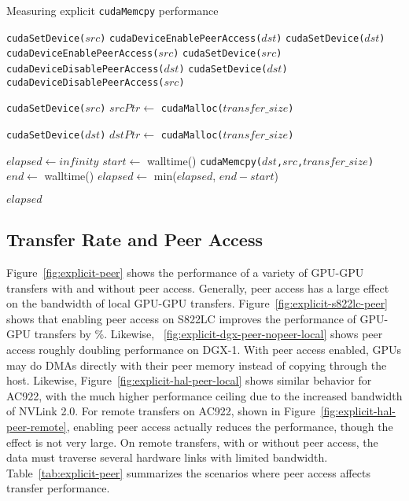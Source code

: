 \begin{algorithm}
    \caption{Measuring explicit \texttt{cudaMemcpy} performance}
    \label{alg:explicit}
    \begin{algorithmic}[1]
    \Statex
            \State \texttt{cudaSetDevice($src$)}
            \State \texttt{cudaDeviceEnablePeerAccess($dst$)}
            \State \texttt{cudaSetDevice($dst$)}
            \State \texttt{cudaDeviceEnablePeerAccess($src$)}
        \Else
            \State \texttt{cudaSetDevice($src$)}
            \State \texttt{cudaDeviceDisablePeerAccess($dst$)}
            \State \texttt{cudaSetDevice($dst$)}
            \State \texttt{cudaDeviceDisablePeerAccess($src$)}        
        \EndIf

        \State \texttt{cudaSetDevice($src$)} 
        \State $srcPtr \gets$ \texttt{cudaMalloc($transfer\_size$)}

        \State \texttt{cudaSetDevice($dst$)} 
        \State $dstPtr \gets$ \texttt{cudaMalloc($transfer\_size$)}

        \State $elapsed \gets infinity$ 
            \State $start \gets$ walltime()
            \State \texttt{cudaMemcpy($dst$,$src$,$transfer\_size$)}
            \State $end \gets$ walltime()
            \State $elapsed \gets$ min($elapsed$, $end-start$)
        \EndFor

    \Return $elapsed$
    \EndFunction

    \end{algorithmic}
\end{algorithm}

\subsection{Transfer Rate and Peer Access}
\label{sec:explicit-peer-bandwidth}

Figure~\ref{fig:explicit-peer} shows the performance of a variety of GPU-GPU transfers with and without peer access.
Generally, peer access has a large effect on the bandwidth of local GPU-GPU transfers.
Figure~\ref{fig:explicit-s822lc-peer} shows that enabling peer access on S822LC improves the performance of GPU-GPU transfers by \%.
Likewise, ~\ref{fig:explicit-dgx-peer-nopeer-local} shows peer access roughly doubling performance on DGX-1.
With peer access enabled, GPUs may do DMAs directly with their peer memory instead of copying through the host.
Likewise, Figure~\ref{fig:explicit-hal-peer-local} shows similar behavior for AC922, with the much higher performance ceiling due to the increased bandwidth of NVLink 2.0.
For remote transfers on AC922, shown in Figure~\ref{fig:explicit-hal-peer-remote}, enabling peer access actually reduces the performance, though the effect is not very large.
On remote transfers, with or without peer access, the data must traverse several hardware links with limited bandwidth.
Table~\ref{tab:explicit-peer} summarizes the scenarios where peer access affects transfer performance.


